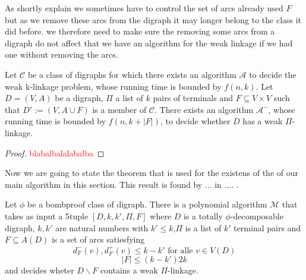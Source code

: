 As shortly explain we sometimes have to control the set of arcs already used $F$ but as we remove these arcs from the digraph it may longer belong to the class it did before. we therefore need to make sure the removing some arcs from a digraph do not affect that we have an algorithm for the weak linkage if we had one without removing the arcs.
\begin{lemma}
    Let $\mathcal{C}$ be a class of digraphs for which there exists an algorithm $\mathcal{A}$ to decide the weak k-linkage problem, whose running time is bounded by $f(n,k)$. Let $D=(V,A)$ be a digraph, $\Pi$ a list of $k$ pairs of terminals and $F\subseteq V\times V$ such that $D':= (V,A\cup F)$ is a member of $\mathcal{C}$. There exists an algorithm  $\mathcal{A}^-$, whose running time is bounded by $f(n,k+|F|)$, to decide whether $D$ has a weak $\Pi$-linkage.
    \label{lemma:deletarcs}
\end{lemma}
\begin{proof}
    \textcolor{red}{blabalbalalabalba}
\end{proof}
Now we are going to state the theorem that is used for the existens of the of our main algorithm in this section. This result is found by ... in .... .
\begin{thm}
    Let $\phi$ be a bombproof class of digraph. There is a polynomial algorithm $\mathcal{M}$ that takes as input a 5tuple $[D,k,k',\Pi,F]$ where $D$ is a totally $\phi$-decomposable digraph, $k,k'$ are natural numbers with $k'\leq k$,$\Pi$ is a list of $k'$ terminal pairs and $F\subseteq A(D)$ is a set of arcs satiesfying 
    \begin{equation}
        d_F^-(v),d_F^+(v)\leq k-k' \text{ for alle } v\in V(D)
    \end{equation}
    \begin{equation*}
        |F|\leq (k-k')2k
    \end{equation*}
    and decides wheter $D\backslash F$ contains a weak $\Pi$-linkage.
    \label{thm:mainalgo}
\end{thm}
   
